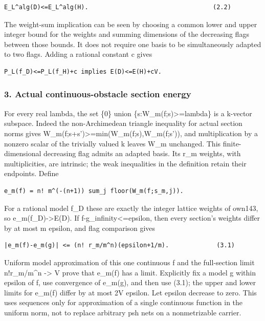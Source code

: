 \documentclass[
  10pt,
]{article}
\begin{document}
\begin{verbatim}
E_L^alg(D)<=E_L^alg(H).                                  (2.2)
\end{verbatim}

The weight-sum implication can be seen by choosing a common lower and
upper integer bound for the weights and summing dimensions of the
decreasing flags between those bounds. It does not require one basis to
be simultaneously adapted to two flags. Adding a rational constant c
gives

\begin{verbatim}
P_L(f_D)<=P_L(f_H)+c implies E(D)<=E(H)+cV.
\end{verbatim}

\subsubsection{3. Actual continuous-obstacle section
energy}\label{actual-continuous-obstacle-section-energy}

For every real lambda, the set \{0\} union
\{s:W\_m(f;s)\textgreater=lambda\} is a k-vector subspace. Indeed the
non-Archimedean triangle inequality for actual section norms gives
W\_m(f;s+s')\textgreater=min(W\_m(f;s),W\_m(f;s')), and multiplication
by a nonzero scalar of the trivially valued k leaves W\_m unchanged.
This finite-dimensional decreasing flag admits an adapted basis. Its
r\_m weights, with multiplicities, are intrinsic; the weak inequalities
in the definition retain their endpoints. Define

\begin{verbatim}
e_m(f) = n! m^(-(n+1)) sum_j floor(W_m(f;s_m,j)).
\end{verbatim}

For a rational model f\_D these are exactly the integer lattice weights
of own143, so e\_m(f\_D)-\textgreater E(D). If
\textbar\textbar f-g\textbar\textbar\_infinity\textless=epsilon, then
every section's weights differ by at most m epsilon, and flag comparison
gives

\begin{verbatim}
|e_m(f)-e_m(g)| <= (n! r_m/m^n)(epsilon+1/m).             (3.1)
\end{verbatim}

Uniform model approximation of this one continuous f and the
full-section limit n!r\_m/m\^{}n -\textgreater{} V prove that e\_m(f)
has a limit. Explicitly fix a model g within epsilon of f, use
convergence of e\_m(g), and then use (3.1); the upper and lower limits
for e\_m(f) differ by at most 2V epsilon. Let epsilon decrease to zero.
This uses sequences only for approximation of a single continuous
function in the uniform norm, not to replace arbitrary psh nets on a
nonmetrizable carrier.
\end{document}
